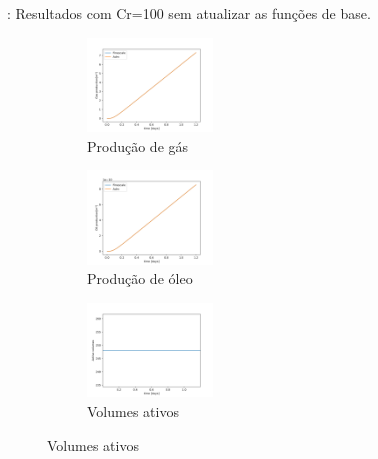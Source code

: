 \documentclass[professionalfont]{beamer}
\begin{document}
\begin{frame}{\FrameProblemName: {\small Resultados com Cr=100 sem atualizar as funções de base.}}
    \begin{figure}[!ht]
        \centering
        \begin{subfigure}{.48\textwidth}
            \centering
            \includegraphics[height=2.5cm]{./imgs/pr2/3k_5000x1x1/cr 100/3k_5000_cr100_no_update/svgtopng/figura_case-finescale_3k_5000_CR100_no_updateGas_production.png}
            \caption{Produção de gás}
        \end{subfigure}
        \hfill
        \begin{subfigure}{.48\textwidth}
            \centering
            \includegraphics[height=2.5cm]{./imgs/pr2/3k_5000x1x1/cr 100/3k_5000_cr100_no_update/svgtopng/figura_case-finescale_3k_5000_CR100_no_updateOil_production.png}
            \caption{Produção de óleo}
        \end{subfigure}
        \bigskip
        \begin{subfigure}{\textwidth}
            \centering
            \includegraphics[height=2.5cm]{./imgs/pr2/3k_5000x1x1/cr 100/3k_5000_cr100_no_update/svgtopng/figura_case-finescale_3k_5000_CR100_no_updateActive_volumes.png}
            \caption{Volumes ativos}
        \end{subfigure}
        \label{fig:fig7_pr2-cr100}
        
    \end{figure}
\end{frame}
\end{document}
